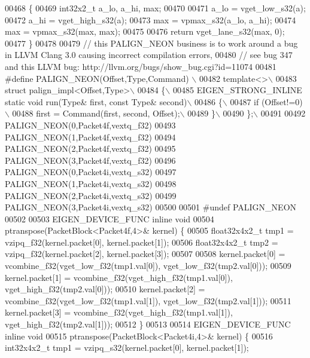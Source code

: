 \begin{DoxyCode}
{{00468 \{
00469   int32x2\_t a\_lo, a\_hi, max;
00470 
00471   a\_lo = vget\_low\_s32(a);
00472   a\_hi = vget\_high\_s32(a);
00473   max = vpmax\_s32(a\_lo, a\_hi);
00474   max = vpmax\_s32(max, max);
00475 
00476   \textcolor{keywordflow}{return} vget\_lane\_s32(max, 0);
00477 \}
00478 
00479 \textcolor{comment}{// this PALIGN\_NEON business is to work around a bug in LLVM Clang 3.0 causing incorrect compilation
       errors,}
00480 \textcolor{comment}{// see bug 347 and this LLVM bug: http://llvm.org/bugs/show\_bug.cgi?id=11074}
00481 \textcolor{preprocessor}{#define PALIGN\_NEON(Offset,Type,Command) \(\backslash\)}
00482 \textcolor{preprocessor}{template<>\(\backslash\)}
00483 \textcolor{preprocessor}{struct palign\_impl<Offset,Type>\(\backslash\)}
00484 \textcolor{preprocessor}{\{\(\backslash\)}
00485 \textcolor{preprocessor}{    EIGEN\_STRONG\_INLINE static void run(Type& first, const Type& second)\(\backslash\)}
00486 \textcolor{preprocessor}{    \{\(\backslash\)}
00487 \textcolor{preprocessor}{        if (Offset!=0)\(\backslash\)}
00488 \textcolor{preprocessor}{            first = Command(first, second, Offset);\(\backslash\)}
00489 \textcolor{preprocessor}{    \}\(\backslash\)}
00490 \textcolor{preprocessor}{\};\(\backslash\)}
00491 \textcolor{preprocessor}{}
00492 PALIGN\_NEON(0,Packet4f,vextq\_f32)
00493 PALIGN\_NEON(1,Packet4f,vextq\_f32)
00494 PALIGN\_NEON(2,Packet4f,vextq\_f32)
00495 PALIGN\_NEON(3,Packet4f,vextq\_f32)
00496 PALIGN\_NEON(0,Packet4i,vextq\_s32)
00497 PALIGN\_NEON(1,Packet4i,vextq\_s32)
00498 PALIGN\_NEON(2,Packet4i,vextq\_s32)
00499 PALIGN\_NEON(3,Packet4i,vextq\_s32)
00500 
00501 \textcolor{preprocessor}{#undef PALIGN\_NEON}
00502 
00503 EIGEN\_DEVICE\_FUNC \textcolor{keyword}{inline} \textcolor{keywordtype}{void}
00504 ptranspose(PacketBlock<Packet4f,4>& kernel) \{
00505   float32x4x2\_t tmp1 = vzipq\_f32(kernel.packet[0], kernel.packet[1]);
00506   float32x4x2\_t tmp2 = vzipq\_f32(kernel.packet[2], kernel.packet[3]);
00507 
00508   kernel.packet[0] = vcombine\_f32(vget\_low\_f32(tmp1.val[0]), vget\_low\_f32(tmp2.val[0]));
00509   kernel.packet[1] = vcombine\_f32(vget\_high\_f32(tmp1.val[0]), vget\_high\_f32(tmp2.val[0]));
00510   kernel.packet[2] = vcombine\_f32(vget\_low\_f32(tmp1.val[1]), vget\_low\_f32(tmp2.val[1]));
00511   kernel.packet[3] = vcombine\_f32(vget\_high\_f32(tmp1.val[1]), vget\_high\_f32(tmp2.val[1]));
00512 \}
00513 
00514 EIGEN\_DEVICE\_FUNC \textcolor{keyword}{inline} \textcolor{keywordtype}{void}
00515 ptranspose(PacketBlock<Packet4i,4>& kernel) \{
00516   int32x4x2\_t tmp1 = vzipq\_s32(kernel.packet[0], kernel.packet[1]);
}}
\end{DoxyCode}
